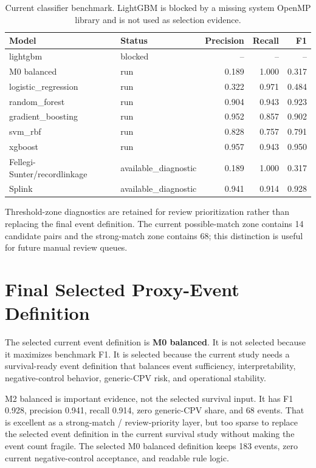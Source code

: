 \documentclass[11pt,a4paper]{article}
\begin{document}
\begin{table}[H]
\centering
\caption{Current classifier benchmark. LightGBM is blocked by a missing system OpenMP library and is not used as selection evidence.}
\small
\begin{tabular}{llrrr}
\toprule
Model & Status & Precision & Recall & F1 \\
\midrule
lightgbm & blocked & -- & -- & -- \\
M0 balanced & run & 0.189 & 1.000 & 0.317 \\
logistic\_regression & run & 0.322 & 0.971 & 0.484 \\
random\_forest & run & 0.904 & 0.943 & 0.923 \\
gradient\_boosting & run & 0.952 & 0.857 & 0.902 \\
svm\_rbf & run & 0.828 & 0.757 & 0.791 \\
xgboost & run & 0.957 & 0.943 & 0.950 \\
Fellegi-Sunter/recordlinkage & available\_diagnostic & 0.189 & 1.000 & 0.317 \\
Splink & available\_diagnostic & 0.941 & 0.914 & 0.928 \\
\bottomrule
\end{tabular}
\end{table}

Threshold-zone diagnostics are retained for review prioritization rather than replacing the final event definition. The current possible-match zone contains 14 candidate pairs and the strong-match zone contains 68; this distinction is useful for future manual review queues.

\section{Final Selected Proxy-Event Definition}
The selected current event definition is \textbf{M0 balanced}. It is not selected because it maximizes benchmark F1. It is selected because the current study needs a survival-ready event definition that balances event sufficiency, interpretability, negative-control behavior, generic-CPV risk, and operational stability.

M2 balanced is important evidence, not the selected survival input. It has F1 0.928, precision 0.941, recall 0.914, zero generic-CPV share, and 68 events. That is excellent as a strong-match / review-priority layer, but too sparse to replace the selected event definition in the current survival study without making the event count fragile. The selected M0 balanced definition keeps 183 events, zero current negative-control acceptance, and readable rule logic.
\end{document}
